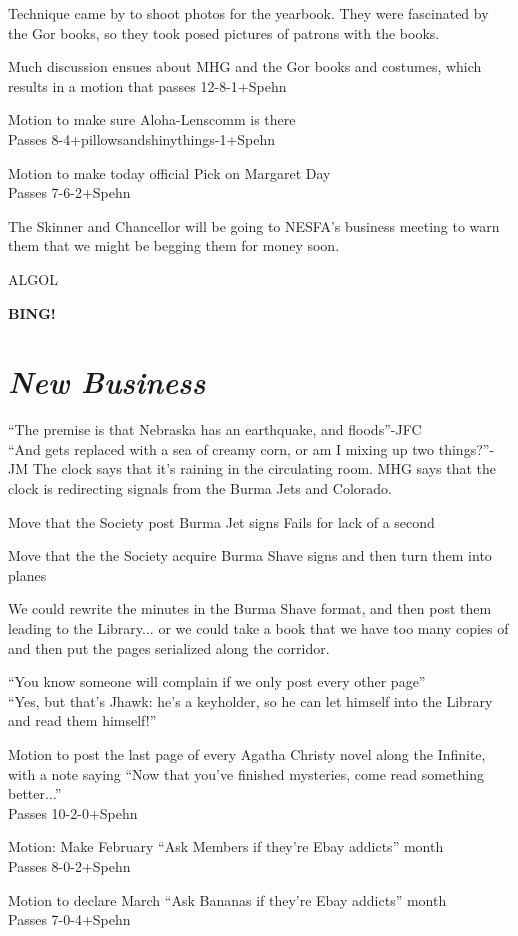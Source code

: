 \documentclass[10pt]{article}
\newcommand{\bing}{{\bf BING!} }
\newcommand{\goto}[1]{\bing \vskip 12pt \section*{{\em{#1}}}}
\begin{document}
Technique came by to shoot photos for the yearbook. They were
fascinated by the Gor books, so they took posed pictures of patrons
with the books.

Much discussion ensues about MHG and the Gor books and costumes, which
results in a motion that passes 12-8-1+Spehn

Motion to make sure Aloha-Lenscomm is there\\
Passes 8-4+pillowsandshinythings-1+Spehn

Motion to make today official Pick on Margaret Day\\
Passes 7-6-2+Spehn

The Skinner and Chancellor will be going to NESFA's business meeting to warn
them that we might be begging them for money soon.

ALGOL

\goto{New Business}
``The premise is that Nebraska has an earthquake, and floods''-JFC\\
``And gets replaced with a sea of creamy corn, or am I mixing up two things?''-JM
The clock says that it's raining in the circulating room.  MHG says
that the clock is redirecting signals from the Burma Jets and
Colorado.

Move that the Society post Burma Jet signs
Fails for lack of a second

Move that the the Society acquire Burma Shave signs and then turn them
into planes

We could rewrite the minutes in the Burma Shave format, and then post
them leading to the Library... or we could take a book that we have
too many copies of and then put the pages serialized along the
corridor.

``You know someone will complain if we only post every other page''\\
``Yes, but that's Jhawk: he's a keyholder, so he can let himself into
the Library and read them himself!''

Motion to post the last page of every Agatha Christy novel along the
Infinite, with a note saying ``Now that you've finished mysteries,
come read something better...''\\
Passes 10-2-0+Spehn

Motion: Make February ``Ask Members if they're Ebay addicts'' month\\
Passes 8-0-2+Spehn

Motion to declare March ``Ask Bananas if they're Ebay addicts'' month\\
Passes 7-0-4+Spehn
\end{document}
